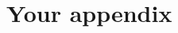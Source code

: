 \documentclass[]{msu-thesis}
\begin{document}
\chapter{Your appendix}
%
\backmatter
%
%
\makebibliographypage %
%
\SingleSpacing
%
%
\end{document}
